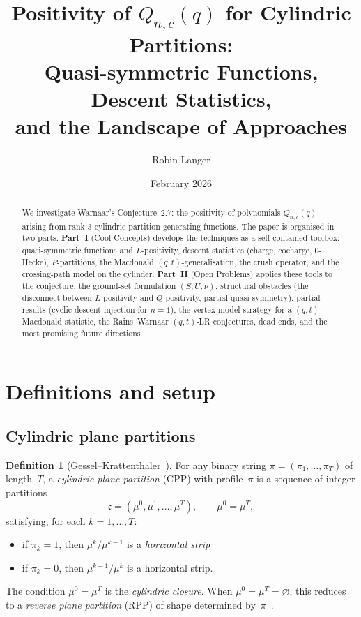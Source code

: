 \documentclass[11pt]{article}
\title{Positivity of $Q_{n,c}(q)$ for Cylindric Partitions:\\
Quasi-symmetric Functions, Descent Statistics,\\
and the Landscape of Approaches}
\author{Robin Langer}
\date{February 2026}
\theoremstyle{plain}
\theoremstyle{definition}
\newtheorem{definition}[theorem]{Definition}
\theoremstyle{remark}
\begin{document}
\maketitle

\begin{abstract}
We investigate Warnaar's Conjecture~2.7: the positivity of
polynomials $Q_{n,c}(q)$ arising from rank-3 cylindric partition
generating functions.  The paper is organised in two parts.
\textbf{Part~I} (Cool Concepts) develops the techniques as a
self-contained toolbox: quasi-symmetric functions and
$L$-positivity, descent statistics (charge, cocharge, $0$-Hecke),
$P$-partitions, the Macdonald $(q,t)$-generalisation, the crush
operator, and the crossing-path model on the cylinder.
\textbf{Part~II} (Open Problems) applies these tools to the
conjecture: the ground-set formulation $(S, U, \nu)$, structural
obstacles (the disconnect between $L$-positivity and
$Q$-positivity, partial quasi-symmetry), partial results
(cyclic descent injection for $n = 1$), the vertex-model
strategy for a $(q,t)$-Macdonald statistic, the
Rains--Warnaar $(q,t)$-LR conjectures, dead ends, and the
most promising future directions.
\end{abstract}

\tableofcontents

\section{Definitions and setup}
\label{sec:defs}

\subsection{Cylindric plane partitions}

\begin{definition}[Gessel--Krattenthaler~\cite{gessel-1984}]\label{def:cpp}
For any binary string $\pi = (\pi_1, \ldots, \pi_T)$ of length~$T$,
a \emph{cylindric plane partition} (CPP) with profile~$\pi$ is a
sequence of integer partitions
\begin{equation}\label{eq:interlacing}
  \mathfrak{c} = (\mu^0, \mu^1, \ldots, \mu^T), \qquad \mu^0 = \mu^T,
\end{equation}
satisfying, for each $k = 1, \ldots, T$:
\begin{itemize}
\item if $\pi_k = 1$, then $\mu^k / \mu^{k-1}$ is a
  \emph{horizontal strip} 
\item if $\pi_k = 0$, then $\mu^{k-1} / \mu^k$ is a
  horizontal strip.
\end{itemize}
The condition $\mu^0 = \mu^T$ is the \emph{cylindric closure}.
When $\mu^0 = \mu^T = \varnothing$, this reduces to a
\emph{reverse plane partition} (RPP) of shape determined
by~$\pi$~\cite{stanley-1972}.
\end{definition}
\end{document}
